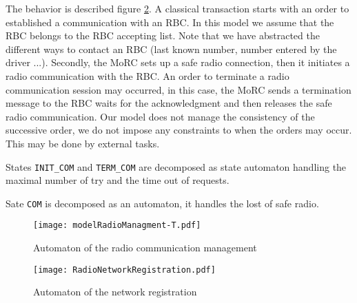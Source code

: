 The behavior is described figure \ref{fig:behavior}.
A classical transaction starts with an order to established a communication with
an RBC. In this model we assume that the RBC belongs to the RBC accepting list.
Note that we have abstracted the different ways to contact an RBC (last known
number, number entered by the driver ...). Secondly, the MoRC sets up a safe radio
connection, then it initiates a radio communication with the RBC.
An order to terminate a radio communication session may occurred, in this case,
the MoRC sends a termination message to the RBC waits for the acknowledgment and
then releases the safe radio communication.
Our model does not manage the consistency of the successive order, we do not
impose any constraints to when the orders may occur. This may be done by external
tasks.

States \verb+INIT_COM+ and \verb+TERM_COM+ are decomposed as state automaton
handling the maximal number of try and the time out of requests.

Sate \verb+COM+ is decomposed as an automaton, it handles the lost of safe
radio.
\begin{figure}[htpb]
\centering
\texttt{[image: modelRadioManagment-T.pdf]}
\caption{\label{fig:behavior}Automaton of the radio communication management}
\end{figure}

\begin{figure}[htpb]
\centering
\texttt{[image: RadioNetworkRegistration.pdf]}
\caption{\label{fig:behavior}Automaton of the network registration}
\end{figure}

